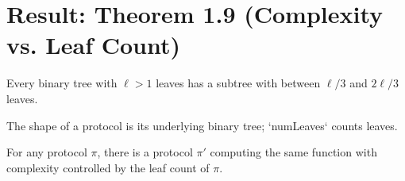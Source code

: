 \chapter{Result: Theorem 1.9 (Complexity vs. Leaf Count)}

\begin{lemma}
  \label{lem:balanced_subtree}
  \leanok
  Every binary tree with $\ell>1$ leaves has a subtree with between
  $\ell/3$ and $2\ell/3$ leaves.
\end{lemma}

\begin{definition}
  \label{def:protocol_shape}
  \leanok
  The shape of a protocol is its underlying binary tree; `numLeaves` counts leaves.
\end{definition}

\begin{theorem}[Theorem 1.9]
  \label{thm:complexity_log_leaves}
  For any protocol $\pi$, there is a protocol $\pi'$ computing the same function
  with complexity controlled by the leaf count of $\pi$.
\end{theorem}
